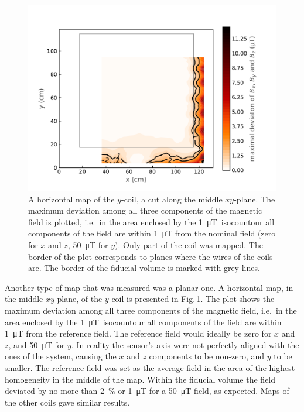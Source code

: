 
\begin{figure}
  \centering
  \includegraphics[width=0.9\linewidth]{gfx/prototype/planar_map_Y_max_deviation.pdf}
  \caption{A horizontal map of the $y$-coil, a cut along the middle $xy$-plane. The maximum deviation among all three components of the magnetic field is plotted, i.e.\ in the area enclosed by the \SI{1}{\micro\tesla}~isocountour all components of the field are within \SI{1}{\micro\tesla} from the nominal field (zero for $x$ and $z$, \SI{50}{\micro\tesla} for $y$). Only part of the coil was mapped. The border of the plot corresponds to planes where the wires of the coils are. The border of the fiducial volume is marked with grey lines.}\label{fig:prototype_plane_map}
\end{figure}

Another type of map that was measured was a planar one. A horizontal map, in the middle $xy$-plane, of the $y$-coil is presented in Fig.\,\ref{fig:prototype_plane_map}. The plot shows the maximum deviation among all three components of the magnetic field, i.e.\ in the area enclosed by the \SI{1}{\micro\tesla}~isocountour all components of the field are within \SI{1}{\micro\tesla} from the reference field. The reference field would ideally be zero for $x$ and $z$, and \SI{50}{\micro\tesla} for $y$. In reality the sensor's axis were not perfectly aligned with the ones of the system, causing the $x$ and $z$ components to be non-zero, and $y$ to be smaller. The reference field was set as the average field in the area of the highest homogeneity in the middle of the map. Within the fiducial volume the field deviated by no more than \SI{2}{\percent} or \SI{1}{\micro\tesla} for a \SI{50}{\micro\tesla} field, as expected. Maps of the other coils gave similar results.




